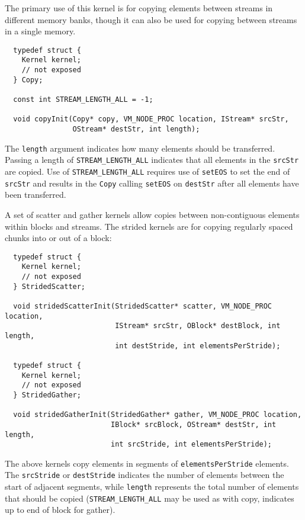  The primary use of this kernel is for copying elements between streams in different memory banks, though it can also be used for copying between streams in a single memory. 
{\small \begin{verbatim}
  typedef struct {
    Kernel kernel;
    // not exposed
  } Copy;
  
  const int STREAM_LENGTH_ALL = -1;
  
  void copyInit(Copy* copy, VM_NODE_PROC location, IStream* srcStr, 
                OStream* destStr, int length);
\end{verbatim}}

The {\tt length} argument indicates how many elements should be transferred. Passing a length of {\tt STREAM\_LENGTH\_ALL} indicates that all elements in the {\tt srcStr} are copied. Use of {\tt STREAM\_LENGTH\_ALL} requires use of {\tt setEOS} to set the end of {\tt srcStr} and results in the {\tt Copy} calling {\tt setEOS} on {\tt destStr} after all elements have been transferred.

 A set of scatter and gather kernels allow copies between non-contiguous elements within blocks and streams.  The strided kernels are for copying regularly spaced chunks into or out of a block: 
{\small \begin{verbatim}
  typedef struct {
    Kernel kernel;
    // not exposed
  } StridedScatter;
  
  void stridedScatterInit(StridedScatter* scatter, VM_NODE_PROC location, 
                          IStream* srcStr, OBlock* destBlock, int length,
                          int destStride, int elementsPerStride);

  typedef struct {
    Kernel kernel;
    // not exposed
  } StridedGather;
  
  void stridedGatherInit(StridedGather* gather, VM_NODE_PROC location, 
                         IBlock* srcBlock, OStream* destStr, int length,
                         int srcStride, int elementsPerStride);
\end{verbatim}}

The above kernels copy elements in segments of {\tt elementsPerStride} elements. The {\tt srcStride} or {\tt destStride} indicates the number of elements between the start of adjacent segments, while {\tt length} represents the total number of elements that should be copied ({\tt STREAM\_LENGTH\_ALL} may be used as with copy, indicates up to end of block for gather).

